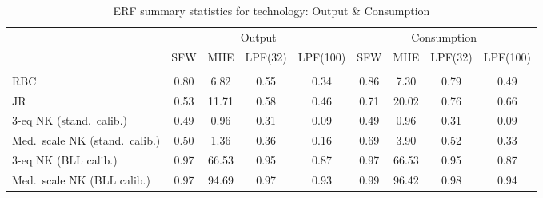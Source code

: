 
\begin{table}[t]
 \centering\tabcolsep=0.2cm
	\small
		\begin{tabular}
		[c]{lcccc||cccc}\toprule 
                  & \multicolumn{4}{c||}{Output} & \multicolumn{4}{c}{Consumption} \\
		   & \scriptsize SFW & \scriptsize MHE & \scriptsize LPF(32) & \scriptsize LPF(100)  & \scriptsize SFW & \scriptsize MHE & \scriptsize LPF(32) & \scriptsize LPF(100) \\[2pt]
		   \hline \hline \\[-4pt]
 		RBC              & 0.80 & 6.82 &0.55 &0.34 & 0.86 & 7.30  &0.79 &0.49 \\[5pt]    
JR  & 0.53 & 11.71 &0.58 &0.46 & 0.71 & 20.02  &0.76 &0.66 \\[5pt]
3-eq NK  (stand.~calib.)            & 0.49 & 0.96 &0.31 &0.09 & 0.49 & 0.96  &0.31 &0.09 \\[5pt]
Med.~scale NK  (stand.~calib.)  & 0.50 & 1.36 &0.36 &0.16 & 0.69 & 3.90  &0.52 &0.33 \\[5pt]
3-eq NK  (BLL calib.) & 0.97 & 66.53 &0.95 &0.87 & 0.97 & 66.53  &0.95 &0.87 \\[5pt]
Med.~scale NK  (BLL calib.)  & 0.97 & 94.69 &0.97 &0.93 & 0.99 & 96.42  &0.98 &0.94 \\[2pt]

		\bottomrule 
	\end{tabular}



\caption{ERF summary statistics for technology: Output \& Consumption  }
\label{tab: main_table}
 
\end{table}
